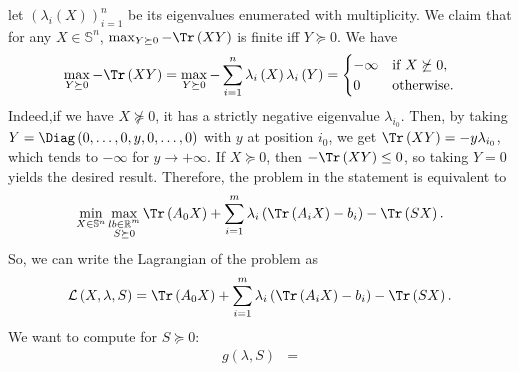 \documentclass{article}
\begin{document}
\begin{itemize}
           let $\left(\lambda_{i}\left(X\right)\right)_{i = 1}^{n}$ 
           be its eigenvalues enumerated
           with multiplicity.
           We claim that for any $X \in \mathbb{S}^{n}$,
           $\max_{Y \succeq 0} - \Tr\left(XY\right)$ 
           is finite iff $Y \succeq 0$.
           We have
           \begin{equation*}
               \max_{Y \succeq 0} - \Tr\left(XY\right) =
               \max_{Y \succeq 0} - \sum_{i = 1}^{n}
               \lambda_{i}\left(X\right) \lambda_{i}\left(Y\right) = 
               \begin{cases}
                   - \infty &\text{if } X \not \succeq 0, \\
                   0 &\text{otherwise}.
               \end{cases}
           \end{equation*}
           Indeed,if we have
           $X \not\succeq 0$, it has
           a strictly negative eigenvalue $\lambda_{i_{0}}$.
           Then, by taking $Y = \Diag\left(0, \ldots, 0, y, 0, \ldots, 0\right)$
           with $y$ at position $i_0$, we get
           $\Tr\left(XY\right) = -y \lambda_{i_0}$,
           which tends to $- \infty$
           for $y \rightarrow +\infty$.
           If $X \succeq 0$, then $-\Tr\left(XY\right) \leq 0$,
           so taking $Y = 0$ yields the 
           desired result.
           Therefore, the problem in the statement is
           equivalent to
           \begin{equation*}
               \min_{X \in \mathbb{S}^{n}}
               \max_{\substack{
               lb \in \mathbb{R}^{m} \\
               S \succeq 0
               }}
               \Tr\left(A_0X\right) +
               \sum_{i = 1}^{m}
               \lambda_{i}\left(\Tr\left(A_{i}X\right) - b_{i}\right)
               - \Tr\left(SX\right).
           \end{equation*}
           So, we can write the Lagrangian of the
           problem as
           \begin{equation*}
               \mathcal{L}\left(X, \lambda, S \right) = 
               \Tr\left(A_0X\right) +
               \sum_{i = 1}^{m} \lambda_{i}
               \left(\Tr\left(A_{i}X\right) - b_{i}\right) - 
               \Tr\left(SX\right).
           \end{equation*}
           We want to compute for $S \succeq 0$:
           \begin{align*}
               g\left(\lambda, S\right) &=

\end{align*}
\end{itemize}
\end{document}
